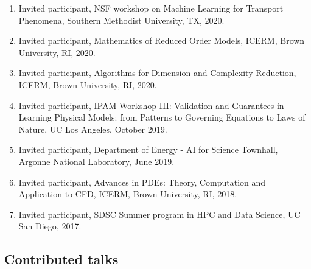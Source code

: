 \documentclass[letterpaper]{article}
\begin{document}
\begin{enumerate}
	  \item Invited participant, NSF workshop on Machine Learning for Transport Phenomena, Southern Methodist University, TX, 2020.

    \item Invited participant, Mathematics of Reduced Order Models, ICERM, Brown University, RI, 2020.

	  \item Invited participant, Algorithms for Dimension and Complexity Reduction, ICERM, Brown University, RI, 2020.

    \item Invited participant, IPAM Workshop III: Validation and Guarantees in Learning Physical Models: from Patterns to Governing Equations to Laws of Nature, UC Los Angeles, October 2019.
    
    \item Invited participant, Department of Energy - AI for Science Townhall, Argonne National Laboratory, June 2019.
    
    \item Invited participant, Advances in PDEs: Theory, Computation and Application to CFD, ICERM, Brown University, RI, 2018.
    
    \item Invited participant, SDSC Summer program in HPC and Data Science, UC San Diego, 2017.
\end{enumerate}

\subsection*{Contributed talks}
\end{document}
